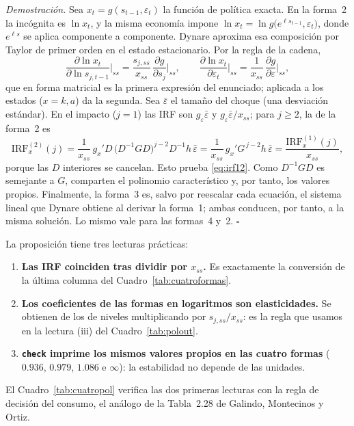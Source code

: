 \documentclass[11pt,a4paper]{report}
\newcommand{\code}[1]{\texttt{#1}}
\begin{document}
\noindent\textit{Demostración.} Sea $x_t=g(s_{t-1},\varepsilon_t)$ la función de
política exacta. En la forma~2 la incógnita es $\ln x_t$, y la misma economía
impone $\ln x_t=\ln g\big(e^{\ell s_{t-1}},\varepsilon_t\big)$, donde
$e^{\ell s}$ se aplica componente a componente. Dynare aproxima esa composición por
Taylor de primer orden en el estado estacionario. Por la regla de la cadena,
\[
\frac{\partial \ln x_t}{\partial \ln s_{j,t-1}}\bigg|_{ss}
=\frac{s_{j,ss}}{x_{ss}}\,\frac{\partial g}{\partial s_{j}}\bigg|_{ss},
\qquad
\frac{\partial \ln x_t}{\partial \varepsilon_t}\bigg|_{ss}
=\frac{1}{x_{ss}}\,\frac{\partial g}{\partial \varepsilon}\bigg|_{ss},
\]
que en forma matricial es la primera expresión del enunciado; aplicada a los estados
($x=k,a$) da la segunda. Sea $\bar{\varepsilon}$ el tamaño del choque (una
desviación estándar). En el impacto ($j=1$) las IRF son $g_\varepsilon\bar{\varepsilon}$
y $g_\varepsilon\bar{\varepsilon}/x_{ss}$; para $j\ge2$, la de la forma~2 es
\[
\mathrm{IRF}^{(2)}_x(j)=\frac{1}{x_{ss}}\,g_x'D\,\big(D^{-1}GD\big)^{j-2}D^{-1}h\,\bar{\varepsilon}
=\frac{1}{x_{ss}}\,g_x'G^{\,j-2}h\,\bar{\varepsilon}=\frac{\mathrm{IRF}^{(1)}_x(j)}{x_{ss}},
\]
porque las $D$ interiores se cancelan. Esto prueba \eqref{eq:irf12}. Como $D^{-1}GD$ es semejante a $G$, comparten
el polinomio característico y, por tanto, los valores propios. Finalmente, la forma~3
es, salvo por reescalar cada ecuación, el sistema lineal que Dynare obtiene al
derivar la forma~1; ambas conducen, por tanto, a la misma solución.
Lo mismo vale para las formas~4 y~2. \hfill$\square$

\medskip
\noindent La proposición tiene tres lecturas prácticas:
\begin{enumerate}[label=(\roman*),nosep,leftmargin=2.2em]
\item \textbf{Las IRF coinciden tras dividir por $x_{ss}$.} Es exactamente la
  conversión de la última columna del Cuadro~\ref{tab:cuatroformas}.
\item \textbf{Los coeficientes de las formas en logaritmos son elasticidades.} Se
  obtienen de los de niveles multiplicando por $s_{j,ss}/x_{ss}$: es la regla que
  usamos en la lectura (iii) del Cuadro~\ref{tab:polout}.
\item \textbf{\code{check} imprime los mismos valores propios en las cuatro formas}
  ($0.936$, $0.979$, $1.086$ e $\infty$): la estabilidad no depende de las unidades.
\end{enumerate}

\noindent El Cuadro~\ref{tab:cuatropol} verifica las dos primeras lecturas con la
regla de decisión del consumo, el análogo de la Tabla~2.28 de Galindo, Montecinos y
Ortiz.
\end{document}
